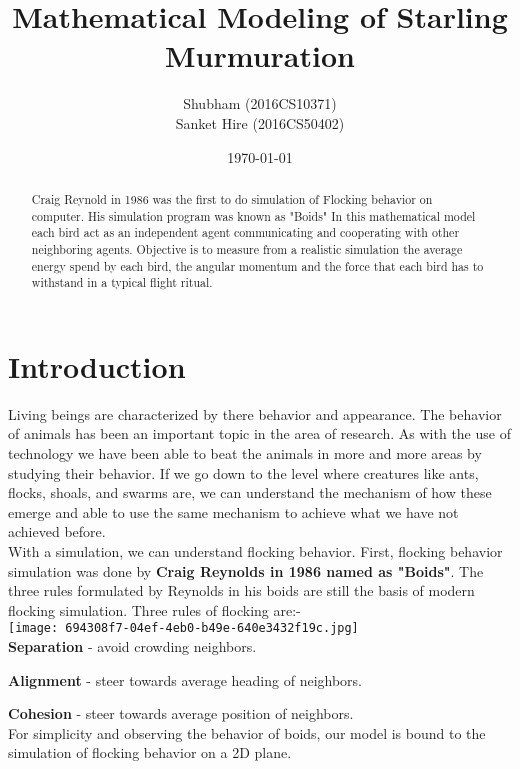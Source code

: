 \documentclass[a4paper]{article}
\title{\textbf{Mathematical Modeling of Starling Murmuration}}
\author{Shubham (2016CS10371) \\ Sanket Hire (2016CS50402)}
\date{\today}
\begin{document}
\maketitle

\begin{abstract}
Craig Reynold in 1986 was the first to do simulation of Flocking behavior on computer. His simulation program was known as "Boids" In this mathematical model each bird act as an independent agent communicating and cooperating with other neighboring agents. Objective is to measure from a realistic simulation the average energy spend by each bird, the angular momentum and the force that each bird has to withstand in a typical flight ritual.
\end{abstract}

\section{Introduction}
\label{sec:introduction}

Living beings are characterized by there behavior and appearance. The behavior of animals has been an important topic in the area of research. As with the use of technology we have been able to beat the animals in more and more areas by studying their behavior. If we go down to the level where creatures like ants, flocks, shoals, and swarms are, we can understand the mechanism of how these emerge and able to use the same mechanism to achieve what we have not achieved before. \\

With a simulation, we can understand flocking behavior. First, flocking behavior simulation was done by\textbf{ Craig Reynolds in 1986 named as "Boids"}.
The three rules formulated by Reynolds in his boids are still the basis of modern flocking simulation. Three rules of flocking are:-\\
\texttt{[image: 694308f7-04ef-4eb0-b49e-640e3432f19c.jpg]}\\

\textbf{Separation} - avoid crowding neighbors.

\textbf{Alignment} - steer towards average heading of neighbors.

\textbf{Cohesion} - steer towards average position of neighbors.\\

For simplicity and observing the behavior of boids, our model is bound to the simulation of flocking behavior on a 2D plane.
\end{document}
